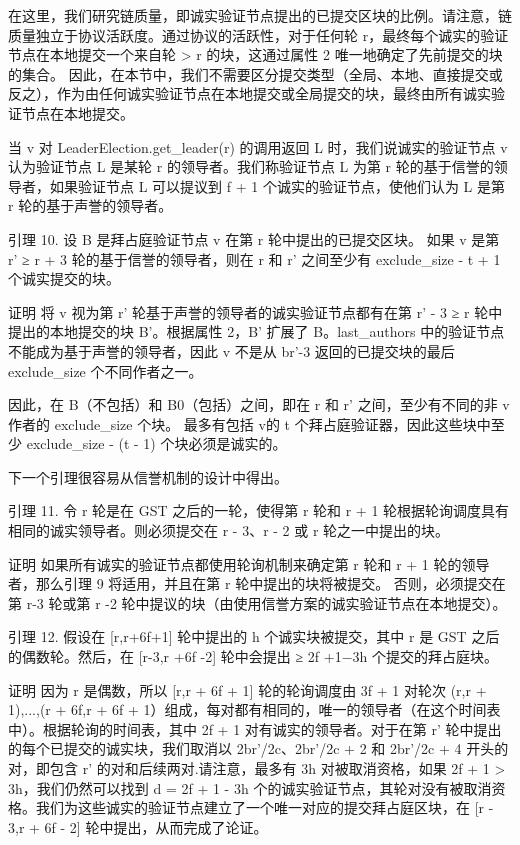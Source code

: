 在这里，我们研究链质量，即诚实验证节点提出的已提交区块的比例。请注意，链质量独立于协议活跃度。通过协议的活跃性，对于任何轮 r，最终每个诚实的验证节点在本地提交一个来自轮 > r 的块，这通过属性 2 唯一地确定了先前提交的块的集合。 因此，在本节中，我们不需要区分提交类型（全局、本地、直接提交或反之），作为由任何诚实验证节点在本地提交或全局提交的块，最终由所有诚实验证节点在本地提交。

当 v 对 LeaderElection.get\_leader(r) 的调用返回 L 时，我们说诚实的验证节点 v 认为验证节点 L 是某轮 r 的领导者。我们称验证节点 L 为第 r 轮的基于信誉的领导者，如果验证节点 L 可以提议到 f + 1 个诚实的验证节点，使他们认为 L 是第 r 轮的基于声誉的领导者。

引理 10. 设 B 是拜占庭验证节点 v 在第 r 轮中提出的已提交区块。 如果 v 是第 r' ≥ r + 3 轮的基于信誉的领导者，则在 r 和 r' 之间至少有 exclude\_size - t + 1 个诚实提交的块。

证明 将 v 视为第 r' 轮基于声誉的领导者的诚实验证节点都有在第 r' - 3 ≥ r 轮中提出的本地提交的块 B'。根据属性 2，B' 扩展了 B。last\_authors 中的验证节点不能成为基于声誉的领导者，因此 v 不是从 br'-3 返回的已提交块的最后 exclude\_size 个不同作者之一。

因此，在 B（不包括）和 B0（包括）之间，即在 r 和 r' 之间，至少有不同的非 v 作者的 exclude\_size 个块。 最多有包括 v的 t 个拜占庭验证器，因此这些块中至少 exclude\_size - (t - 1) 个块必须是诚实的。

下一个引理很容易从信誉机制的设计中得出。

引理 11. 令 r 轮是在 GST 之后的一轮，使得第 r 轮和 r + 1 轮根据轮询调度具有相同的诚实领导者。则必须提交在 r - 3、r - 2 或 r 轮之一中提出的块。

证明 如果所有诚实的验证节点都使用轮询机制来确定第 r 轮和 r + 1 轮的领导者，那么引理 9 将适用，并且在第 r 轮中提出的块将被提交。 否则，必须提交在第 r-3 轮或第 r -2 轮中提议的块（由使用信誉方案的诚实验证节点在本地提交）。

引理 12. 假设在 [r,r+6f+1] 轮中提出的 h 个诚实块被提交，其中 r 是 GST 之后的偶数轮。然后，在 [r-3,r +6f -2] 轮中会提出 ≥ 2f +1−3h 个提交的拜占庭块。

证明 因为 r 是偶数，所以 [r,r + 6f + 1] 轮的轮询调度由 3f + 1 对轮次 (r,r + 1),...,(r + 6f,r + 6f + 1）组成，每对都有相同的，唯一的领导者（在这个时间表中）。根据轮询的时间表，其中 2f + 1 对有诚实的领导者。对于在第 r' 轮中提出的每个已提交的诚实块，我们取消以 2br'/2c、2br'/2c + 2 和 2br'/2c + 4 开头的对，即包含 r' 的对和后续两对.请注意，最多有 3h 对被取消资格，如果 2f + 1 > 3h，我们仍然可以找到 d = 2f + 1 - 3h 个的诚实验证节点，其轮对没有被取消资格。我们为这些诚实的验证节点建立了一个唯一对应的提交拜占庭区块，在 [r - 3,r + 6f - 2] 轮中提出，从而完成了论证。

